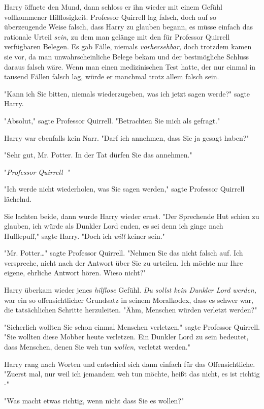 {Harry öffnete den Mund, dann schloss er ihn wieder mit einem Gefühl vollkommener Hilflosigkeit. Professor Quirrell lag falsch, doch auf so überzeugende Weise falsch, dass Harry zu glauben begann, es müsse einfach das rationale Urteil \emph{sein,} zu dem man gelänge mit den für Professor Quirrell verfügbaren Belegen. Es gab Fälle, niemals \emph{vorhersehbar,} doch trotzdem kamen sie vor, da man unwahrscheinliche Belege bekam und der bestmögliche Schluss daraus falsch wäre. Wenn man einen medizinischen Test hatte, der nur einmal in tausend Fällen falsch lag, würde er manchmal trotz allem falsch sein.

"Kann ich Sie bitten, niemals wiederzugeben, was ich jetzt sagen werde?" sagte Harry.

"Absolut," sagte Professor Quirrell. "Betrachten Sie mich als gefragt."

Harry war ebenfalls kein Narr. "Darf ich annehmen, dass Sie ja gesagt haben?"

"Sehr gut, Mr. Potter. In der Tat dürfen Sie das annehmen."

"\emph{Professor Quirrell -}"

"Ich werde nicht wiederholen, was Sie sagen werden," sagte Professor Quirrell lächelnd.

Sie lachten beide, dann wurde Harry wieder ernst. "Der Sprechende Hut schien zu glauben, ich würde als Dunkler Lord enden, es sei denn ich ginge nach Hufflepuff," sagte Harry. "Doch ich \emph{will} keiner sein."

"Mr. Potter…" sagte Professor Quirrell. "Nehmen Sie das nicht falsch auf. Ich verspreche, nicht nach der Antwort über Sie zu urteilen. Ich möchte nur Ihre eigene, ehrliche Antwort hören. Wieso nicht?"

Harry überkam wieder jenes \emph{hilflose} Gefühl. \emph{Du sollst kein Dunkler Lord werden,} war ein so offensichtlicher Grundsatz in seinem Moralkodex, dass es schwer war, die tatsächlichen Schritte herzuleiten. "Ähm, Menschen würden verletzt werden?"

"Sicherlich wollten Sie schon einmal Menschen verletzen," sagte Professor Quirrell. "Sie wollten diese Mobber heute verletzen. Ein Dunkler Lord zu sein bedeutet, dass Menschen, denen Sie weh tun \emph{wollen,} verletzt werden."

Harry rang nach Worten und entschied sich dann einfach für das Offensichtliche. "Zuerst mal, nur weil ich jemandem weh tun möchte, heißt das nicht, es ist richtig -"

"Was macht etwas richtig, wenn nicht dass Sie es wollen?"

}
